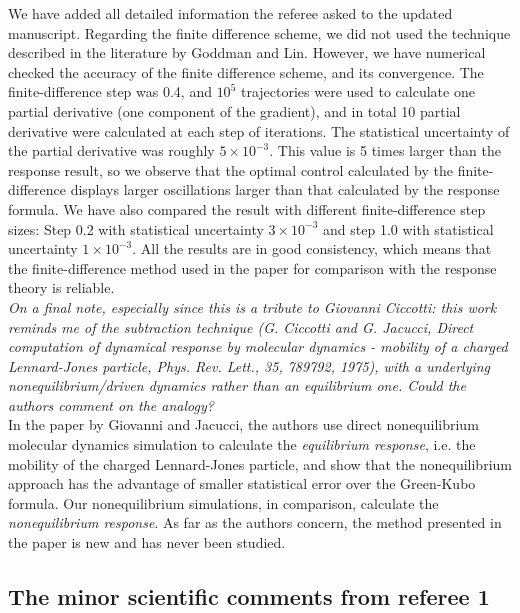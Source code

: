 \documentclass[]{revtex4-1}
\begin{document}
We have added all detailed information the referee asked to the updated
manuscript. Regarding the finite difference scheme, we did not used
the technique described in the literature by Goddman and Lin.
However, we have numerical checked the accuracy of the finite
difference scheme, and its convergence.  The finite-difference step
was 0.4, and $10^5$ trajectories were used to calculate one
partial derivative (one component of the gradient), and in total
10 partial derivative were calculated at each step of iterations.
The statistical uncertainty of the
partial derivative was roughly
$5\times 10^{-3}$.  This value is 5 times larger than the
response result, so we observe that the optimal control calculated
by the finite-difference displays larger oscillations
larger than that calculated
by the response formula. We have also compared the result with 
different finite-difference step sizes:  Step 0.2 with
statistical uncertainty $3\times 10^{-3}$ 
and step 1.0 with statistical uncertainty
$1\times 10^{-3}$.
All the results are in good consistency, which means
that the finite-difference method used  in the paper for comparison with
the response theory is reliable.\\

\emph{
On a final note, especially since this is a tribute to Giovanni Ciccotti: this work reminds
me of the subtraction technique (G. Ciccotti and G. Jacucci, Direct computation of dynamical
response by molecular dynamics - mobility of a charged Lennard-Jones particle, Phys. Rev.
Lett., 35, 789792, 1975), with a underlying nonequilibrium/driven dynamics rather than an
equilibrium one. Could the authors comment on the analogy?
}\\

In the paper by Giovanni and Jacucci, the authors use direct
nonequilibrium molecular dynamics simulation to 
calculate the \emph{equilibrium response}, i.e. the mobility of the charged
Lennard-Jones particle, and show that
the nonequilibrium approach has the advantage of smaller statistical error over
the Green-Kubo formula. Our  nonequilibrium simulations,
in comparison, calculate the
\emph{nonequilibrium response}.
As far as the authors concern, the method presented in the paper is new and
has never been studied.



\subsection*{The minor scientific comments from referee 1}
\end{document}
